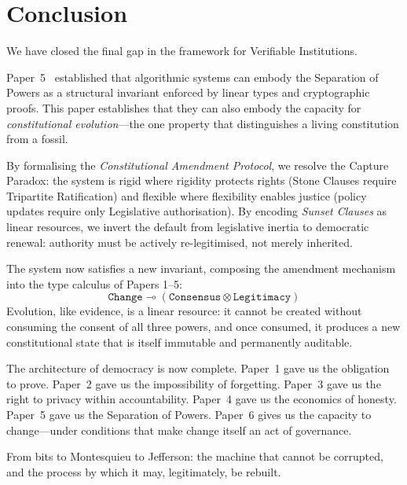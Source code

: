\section{Conclusion}
\label{sec:conclusion}

We have closed the final gap in the framework for Verifiable
Institutions.

Paper~5~\cite{btv-cc} established that algorithmic systems can
embody the Separation of Powers as a structural invariant enforced
by linear types and cryptographic proofs. This paper establishes
that they can also embody the capacity for \emph{constitutional
evolution}---the one property that distinguishes a living
constitution from a fossil.

By formalising the \emph{Constitutional Amendment Protocol}, we
resolve the Capture Paradox: the system is rigid where rigidity
protects rights (Stone Clauses require Tripartite Ratification)
and flexible where flexibility enables justice (policy updates
require only Legislative authorisation). By encoding
\emph{Sunset Clauses} as linear resources, we invert the default
from legislative inertia to democratic renewal: authority must be
actively re-legitimised, not merely inherited.

The system now satisfies a new invariant, composing the amendment
mechanism into the type calculus of Papers 1--5:
\[
  \texttt{Change} \multimap
  (\texttt{Consensus} \otimes \texttt{Legitimacy})
\]
Evolution, like evidence, is a linear resource: it cannot be created
without consuming the consent of all three powers, and once consumed,
it produces a new constitutional state that is itself immutable and
permanently auditable.

The architecture of democracy is now complete. Paper~1 gave us the
obligation to prove. Paper~2 gave us the impossibility of forgetting.
Paper~3 gave us the right to privacy within accountability.
Paper~4 gave us the economics of honesty. Paper~5 gave us the
Separation of Powers. Paper~6 gives us the capacity to change---under
conditions that make change itself an act of governance.

From bits to Montesquieu to Jefferson: the machine that cannot be
corrupted, and the process by which it may, legitimately, be
rebuilt.

